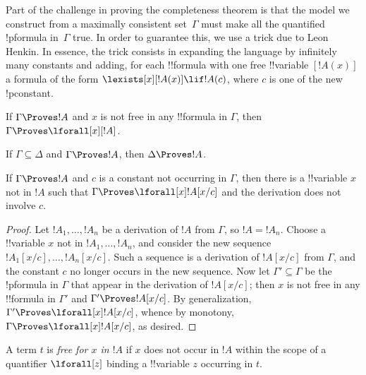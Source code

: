 \documentclass[../../include/open-logic-section]{subfiles}
\begin{document}

\begin{explain}
Part of the challenge in proving the completeness theorem is that the
model we construct from a maximally consistent set~$\Gamma$ must make
all the quantified !p{formula} in~$\Gamma$ true.  In order to guarantee
this, we use a trick due to Leon Henkin.  In essence, the trick
consists in expanding the language by infinitely many constants and
adding, for each !!{formula} with one free !!{variable} $[!A(x)]$ a formula of
the form $\lexists[x][!A(x)] \lif !A(c)$, where $c$ is one of the new
!p{constant}.  
\end{explain}

\begin{prop}[Generalization]
If $\Gamma \Proves !A$ and $x$ is not free in any !!{formula} in
$\Gamma$, then $\Gamma \Proves \lforall[x][!A]$.
\end{prop}

\begin{prop}[Monotony]
If $\Gamma \subseteq \Delta$ and $\Gamma \Proves !A$, then $\Delta
\Proves !A$.
\end{prop}

\begin{thm}
If $\Gamma \Proves !A$ and $c$ is a constant not occurring in
$\Gamma$, then there is a !!{variable} $x$ not in $!A$ such that $\Gamma
\Proves \lforall[x] !A [x/c]$ and the derivation does not involve $c$.
\end{thm}

\begin{proof}
Let $!A_1, \dots, !A_n$ be a derivation of $!A$ from $\Gamma$, so $!A
= !A_n$.  Choose a !!{variable} $x$ not in $!A_1, \dots, !A_n$, and
consider the new sequence $!A_1[x/c], \dots, !A_n [x/c]$. Such a
sequence is a derivation of $!A[x/c]$ from $\Gamma$, and the constant
$c$ no longer occurs in the new sequence.
Now let $\Gamma' \subseteq \Gamma$ be the !p{formula} in $\Gamma$ that
appear in the derivation of $!A [x/c]$; then $x$ is not free in any
!!{formula} in $\Gamma'$ and $\Gamma' \Proves !A [x/c]$. By
generalization, $\Gamma' \Proves \lforall[x] !A[x/c]$, whence by
monotony, $\Gamma \Proves \lforall[x] !A [x/c]$, as desired.
\end{proof}

\begin{defn} 
A term $t$ is \emph{free for $x$ in $!A$} if $x$ does not occur in
$!A$ within the scope of a quantifier $\lforall[z]$ binding a !!{variable}
$z$ occurring in $t$.
\end{defn}
\end{document}
